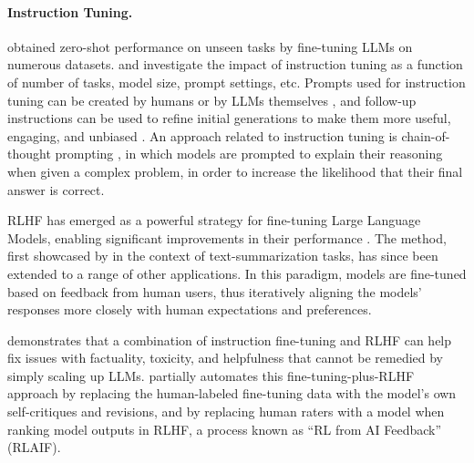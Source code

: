 \documentclass{article}
\begin{document}
\paragraph{Instruction Tuning.} 

\citet{weifinetuned} obtained zero-shot performance on unseen tasks by fine-tuning LLMs on numerous datasets. 
\citet{Chung2022ScalingIL} and \citet{longpre2023flan} investigate the impact of instruction tuning as a function of number of tasks, model size, prompt settings, etc. Prompts used for instruction tuning can be created by humans or by LLMs themselves \citep{zhou2022large}, and follow-up instructions can be used to refine initial generations to make them more useful, engaging, and unbiased \citep{ganguli2023capacity,madaan2023self}. An approach related to instruction tuning is chain-of-thought prompting \citep{wei2022chain}, in which models are prompted to explain their reasoning when given a complex problem, in order to increase the likelihood that their final answer is correct.

RLHF has emerged as a powerful strategy for fine-tuning Large Language Models, enabling significant improvements in their performance \citep{christiano-etal-2017-deep}. The method, first showcased by \citet{stienon2020learning} in the context of text-summarization tasks, has since been extended to a range of other applications. In this paradigm, models are fine-tuned based on feedback from human users, thus iteratively aligning the models' responses more closely with human expectations and preferences.

\citet{ouyang2022training} demonstrates that a combination of instruction fine-tuning and RLHF can help fix issues with factuality, toxicity, and helpfulness that cannot be remedied by simply scaling up LLMs. \citet{bai2022constitutional} partially automates this fine-tuning-plus-RLHF approach by replacing the human-labeled fine-tuning data with the model's own self-critiques and revisions, and by replacing human raters with 
a model when ranking model outputs in RLHF, a process known as ``RL from AI Feedback'' (RLAIF).
\end{document}
